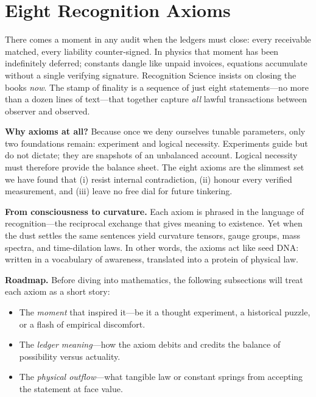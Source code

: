\documentclass[11pt,oneside]{book}
\begin{document}
\chapter{Eight Recognition Axioms}
\label{sec:eight-axioms}

\noindent
There comes a moment in any audit when the ledgers must close: every
receivable matched, every liability counter-signed.  In physics that
moment has been indefinitely deferred; constants dangle like unpaid
invoices, equations accumulate without a single verifying signature.
Recognition Science insists on closing the books \emph{now}.  The stamp
of finality is a sequence of just eight statements—no more than a dozen
lines of text—that together capture \emph{all} lawful transactions
between observer and observed.

\medskip
\noindent
\textbf{Why axioms at all?}  
Because once we deny ourselves tunable parameters, only two foundations
remain: experiment and logical necessity.  Experiments guide but do not
dictate; they are snapshots of an unbalanced account.  Logical necessity
must therefore provide the balance sheet.  The eight axioms are the
slimmest set we have found that (i) resist internal contradiction,
(ii) honour every verified measurement, and (iii) leave no free dial for
future tinkering.

\medskip
\noindent
\textbf{From consciousness to curvature.}  
Each axiom is phrased in the language of recognition—the reciprocal
exchange that gives meaning to existence.  Yet when the dust settles the
same sentences yield curvature tensors, gauge groups, mass spectra, and
time-dilation laws.  In other words, the axioms act like seed DNA:
written in a vocabulary of awareness, translated into a protein of
physical law.

\medskip
\noindent
\textbf{Roadmap.}  
Before diving into mathematics, the following subsections will treat
each axiom as a short story:

\begin{itemize}
\item The \emph{moment} that inspired it—be it a thought experiment,
      a historical puzzle, or a flash of empirical discomfort.  
\item The \emph{ledger meaning}—how the axiom debits and credits the
      balance of possibility versus actuality.  
\item The \emph{physical outflow}—what tangible law or constant springs
      from accepting the statement at face value.  
\end{itemize}
\end{document}

